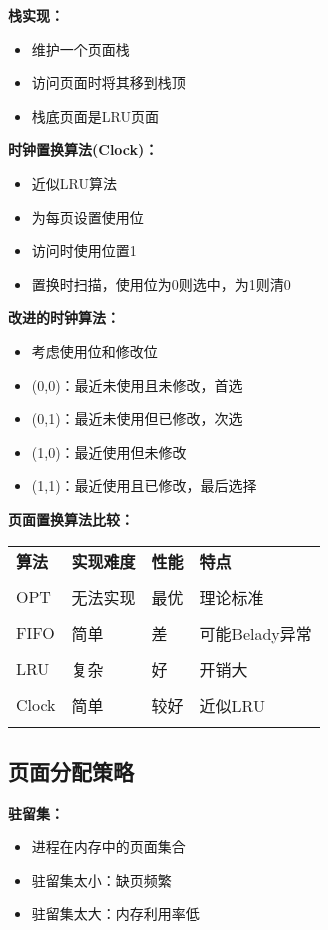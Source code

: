 \documentclass[lang=cn,newtx,10pt,scheme=chinese]{../../elegantbook}
\begin{document}
\textbf{栈实现：}
\begin{itemize}
  \item 维护一个页面栈
  \item 访问页面时将其移到栈顶
  \item 栈底页面是LRU页面
\end{itemize}

\textbf{时钟置换算法(Clock)：}
\begin{itemize}
  \item 近似LRU算法
  \item 为每页设置使用位
  \item 访问时使用位置1
  \item 置换时扫描，使用位为0则选中，为1则清0
\end{itemize}

\textbf{改进的时钟算法：}
\begin{itemize}
  \item 考虑使用位和修改位
  \item (0,0)：最近未使用且未修改，首选
  \item (0,1)：最近未使用但已修改，次选
  \item (1,0)：最近使用但未修改
  \item (1,1)：最近使用且已修改，最后选择
\end{itemize}

\textbf{页面置换算法比较：}
\begin{longtable}{@{}p{3cm}p{3cm}p{3cm}p{3cm}@{}}
\toprule
\textbf{算法} & \textbf{实现难度} & \textbf{性能} & \textbf{特点} \\\\ \midrule
\endhead

OPT & 无法实现 & 最优 & 理论标准 \\\\
FIFO & 简单 & 差 & 可能Belady异常 \\\\
LRU & 复杂 & 好 & 开销大 \\\\
Clock & 简单 & 较好 & 近似LRU \\\\

\bottomrule
\end{longtable}

\subsection{页面分配策略}

\textbf{驻留集：}
\begin{itemize}
  \item 进程在内存中的页面集合
  \item 驻留集太小：缺页频繁
  \item 驻留集太大：内存利用率低
\end{itemize}
\end{document}
